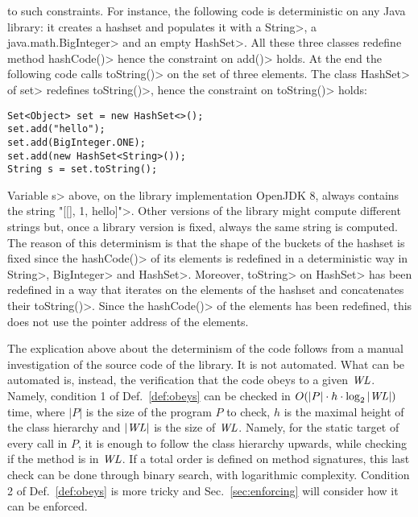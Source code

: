 to such constraints. For instance, the following code is deterministic
on any Java library: it creates a hashset and populates it with a
\<String>, a \<java.math.BigInteger> and an empty \<HashSet>. All these three
classes redefine method \<hashCode()> hence the constraint on \<add()> holds.
At the end the following code calls \<toString()> on the set of three elements.
The class \<HashSet> of \<set> redefines \<toString()>, hence the constraint
on \<toString()> holds:
%
\begin{verbatim}
Set<Object> set = new HashSet<>();
set.add("hello");
set.add(BigInteger.ONE);
set.add(new HashSet<String>());
String s = set.toString();
\end{verbatim}
%
Variable \<s> above, on the library implementation OpenJDK 8, always contains the string
\<"[[], 1, hello]">. Other versions of the library might compute different strings but,
once a library version is fixed, always the same string is computed.
The reason of this determinism is that the shape of the buckets of the hashset is fixed
since the \<hashCode()> of its elements is redefined in a deterministic way in
\<String>, \<BigInteger> and \<HashSet>. Moreover, \<toString> on \<HashSet> has been
redefined in a way that iterates on the elements of the hashset and concatenates
their \<toString()>. Since the \<hashCode()> of the elements has been redefined,
this does not use the pointer address of the elements.

The explication above about the determinism of the code follows from
a manual investigation of the source code of the library. It is not automated. What can
be automated is, instead, the verification that the code obeys to a given $\mathit{WL}$.
Namely, condition 1 of Def.~\ref{def:obeys} can be checked
in $O(|P|\cdot h\cdot\log_2|\mathit{WL}|)$ time, where $|P|$ is the size of the program $P$ to check,
$h$ is the maximal height of the class
hierarchy and $|\mathit{WL}|$ is the size of $\mathit{WL}$.
Namely, for the static target of every call in $P$, it is enough
to follow the class hierarchy upwards, while checking if the method is in $\mathit{WL}$. If a total
order is defined on method signatures, this last check can be done through binary search,
with logarithmic complexity. Condition 2 of Def.~\ref{def:obeys} is more tricky and
Sec.~\ref{sec:enforcing} will consider how it can be enforced.

